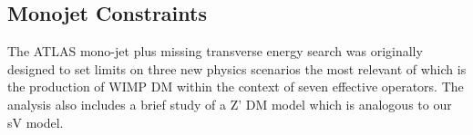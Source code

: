 

\subsection{Monojet Constraints}
\label{monojet_constraints}
The ATLAS mono-jet plus missing transverse energy search \cite{Aad:2015zva} was originally designed to set limits on three new physics scenarios\comm{,}
the most relevant of which is the production of WIMP DM within the context of seven  effective operators. The analysis also includes a brief study of a Z' DM model which is analogous to our sV model.

